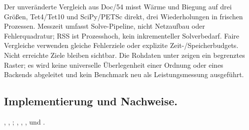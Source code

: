 Der unveränderte Vergleich aus Doc/54 misst Wärme und Biegung auf drei Größen,
Tet4/Tet10 und SciPy/PETSc direkt, drei Wiederholungen in frischen Prozessen.
Messzeit umfasst Solve-Pipeline, nicht Netzaufbau oder Fehlerquadratur;
RSS ist Prozesshoch, kein inkrementeller Solverbedarf. Faire Vergleiche
verwenden gleiche Fehlerziele oder explizite Zeit-/Speicherbudgets.
Nicht erreichte Ziele bleiben sichtbar. Die Rohdaten unter
 zeigen ein begrenztes Raster;
es wird keine universelle Überlegenheit einer Ordnung oder eines Backends
abgeleitet und kein Benchmark neu als Leistungsmessung ausgeführt.

\subsection*{Implementierung und Nachweise.}
{\small\raggedright
{},
,
;
,
, ,
 und
.

\par}
